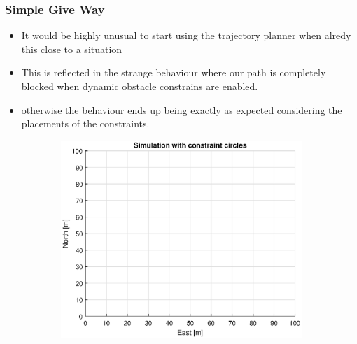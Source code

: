 \subsubsection{Simple Give Way}
\begin{itemize}
    \item It would be highly unusual to start using the trajectory planner when alredy this close to a situation
    \item This is reflected in the strange behaviour where our path is completely blocked when dynamic obstacle constrains are enabled.
    \item otherwise the behaviour ends up being exactly as expected considering the placements of the constraints.
\end{itemize}
\clearpage
\begin{figure}[!b] %
    \begin{subfigure}[b]{0.49\textwidth}
        \centering
        \includegraphics[width=\textwidth]{Images/Figures/Enkel_GW/Simple0_f1_Frame1}
    \end{subfigure}
    \hfill
    \begin{subfigure}[b]{0.499\textwidth}
        \centering

\end{subfigure}
\end{figure}
